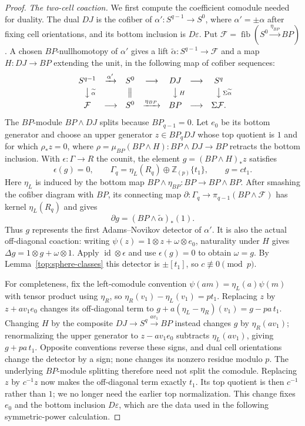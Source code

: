 \begin{proof}
\smallskip\noindent\emph{The two-cell coaction.}
We first compute the coefficient comodule needed for duality.
The dual $DJ$ is the cofiber of
$\alpha':S^{q-1}\to S^0$, where $\alpha'=\pm\alpha$ after fixing
cell orientations, and its bottom inclusion is $D\varepsilon$.
Put $\mathcal F=\operatorname{fib}(S^0\xrightarrow{\eta_{BP}}BP)$.
A chosen $BP$-nullhomotopy of $\alpha'$ gives a lift
$\widetilde\alpha:S^{q-1}\to\mathcal F$ and a map $H:DJ\to BP$
extending the unit, in the following map of cofiber sequences:
\[
\begin{array}{ccccccc}
 S^{q-1}&\xrightarrow{\alpha'}&S^0&\longrightarrow&DJ&
       \longrightarrow&S^q\\[2pt]
 \big\downarrow\mathrlap{\,\scriptstyle\widetilde\alpha}&&
 \big\Vert&&\big\downarrow\mathrlap{\,\scriptstyle H}&&
 \big\downarrow\mathrlap{\,\scriptstyle\Sigma\widetilde\alpha}\\[2pt]
 \mathcal F&\longrightarrow&S^0&\xrightarrow{\eta_{BP}}&BP&
       \longrightarrow&\Sigma\mathcal F .
\end{array}
\]
The $BP$-module $BP\wedge DJ$ splits because $BP_{q-1}=0$.
Let $e_0$ be its bottom generator and choose an upper generator
$z\in BP_qDJ$ whose top quotient is $1$ and for which
$\rho_*z=0$, where $\rho=\mu_{BP}(BP\wedge H):BP\wedge DJ\to BP$
retracts the bottom inclusion. With $\epsilon:\Gamma\to R$
the counit, the element $g=(BP\wedge H)_*z$ satisfies
\[
 \epsilon(g)=0,\qquad
 \Gamma_q=\eta_L(R_q)\oplus\mathbb Z_{(p)}\{t_1\},
 \qquad g=ct_1.
\]
Here $\eta_L$ is induced by the bottom map
$BP\wedge\eta_{BP}:BP\to BP\wedge BP$.
After smashing the cofiber diagram with $BP$, its connecting
map $\partial:\Gamma_q\to\pi_{q-1}(BP\wedge\mathcal F)$ has kernel
$\eta_L(R_q)$ and gives
\[
 \partial g=(BP\wedge\widetilde\alpha)_*(1).
\]
Thus $g$ represents the first Adams--Novikov detector of
$\alpha'$. It is also the actual off-diagonal coaction:
writing $\psi(z)=1\otimes z+\omega\otimes e_0$, naturality
under $H$ gives
$\Delta g=1\otimes g+\omega\otimes1$.
Apply $\operatorname{id}\otimes\epsilon$ and use
$\epsilon(g)=0$ to obtain $\omega=g$.
By Lemma~\ref{top:sphere-classes} this detector is
$\pm[t_1]$, so $c\not\equiv0\pmod p$.

For completeness, fix the left-comodule convention
$\psi(am)=\eta_L(a)\psi(m)$ with tensor product using $\eta_R$,
so $\eta_R(v_1)-\eta_L(v_1)=pt_1$.
Replacing $z$ by $z+av_1e_0$ changes its off-diagonal term to
$g+a(\eta_L-\eta_R)(v_1)=g-pa\,t_1$.
Changing $H$ by the composite
$DJ\to S^q\xrightarrow{av_1}BP$ instead changes $g$ by
$\eta_R(av_1)$; renormalizing the upper generator to
$z-av_1e_0$ subtracts $\eta_L(av_1)$, giving $g+pa\,t_1$.
Opposite conventions reverse these signs, and dual cell
orientations change the detector by a sign; none changes its
nonzero residue modulo $p$. The underlying $BP$-module splitting
therefore need not split the comodule.
Replacing $z$ by $c^{-1}z$ now makes the off-diagonal term
exactly $t_1$. Its top quotient is then $c^{-1}$ rather than $1$;
we no longer need the earlier top normalization. This change fixes
$e_0$ and the bottom inclusion $D\varepsilon$, which are the data
used in the following symmetric-power calculation.


\end{proof}
